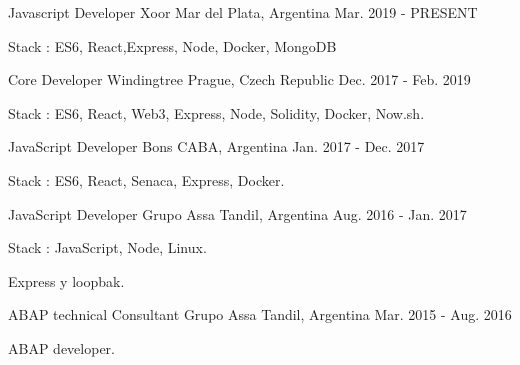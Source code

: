 


\begin{cventries}

\cventry
{Javascript Developer} %
{Xoor} %
{Mar del Plata, Argentina} %
{Mar. 2019 - PRESENT} %
{ %
\begin{cvitems}
\item {Stack : ES6, React,Express, Node, Docker, MongoDB}
\end{cvitems}
}
\cventry
{Core Developer} %
{Windingtree} %
{Prague, Czech Republic} %
{Dec. 2017 - Feb. 2019} %
{ %
\begin{cvitems}
\item {Stack : ES6, React, Web3, Express, Node, Solidity, Docker, Now.sh.}
\end{cvitems}
}
\cventry
{ JavaScript Developer} %
{Bons} %
{CABA, Argentina} %
{Jan. 2017 - Dec. 2017} %
{ %
\begin{cvitems}
\item {Stack : ES6, React, Senaca, Express, Docker.}
\end{cvitems}
}
\cventry
{ JavaScript Developer} %
{Grupo Assa} %
{Tandil, Argentina} %
{Aug. 2016 - Jan. 2017} %
{ %
\begin{cvitems}
\item {Stack : JavaScript, Node, Linux.}
\item {Express y loopbak.}
\end{cvitems}
}

\cventry
{ABAP technical Consultant} %
{Grupo Assa} %
{Tandil, Argentina} %
{Mar. 2015 - Aug. 2016} %
{ %
\begin{cvitems}
\item {ABAP developer.}
\end{cvitems}
}

\end{cventries}
